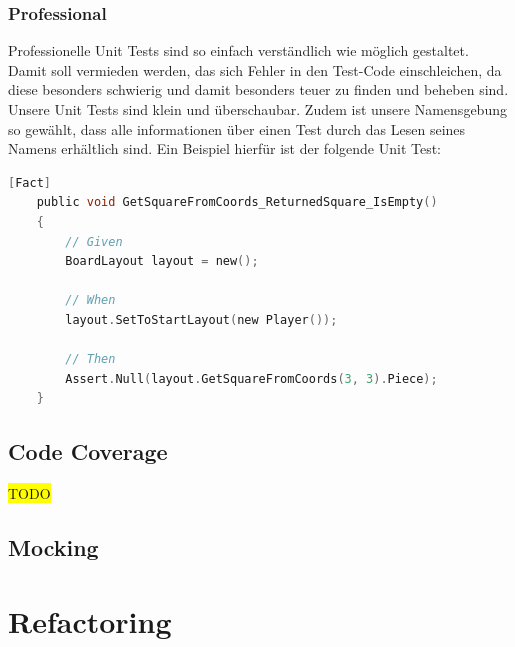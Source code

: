 \documentclass[
10pt, %
a4paper, %
oneside, %
headinclude,footinclude, %
BCOR5mm, %
]{scrartcl}
\begin{document}
\subsubsection{Professional}
Professionelle Unit Tests sind so einfach verständlich wie möglich gestaltet. Damit soll vermieden werden, das sich Fehler in den Test-Code einschleichen, da diese besonders schwierig und damit besonders teuer zu finden und beheben sind.
Unsere Unit Tests sind klein und überschaubar. Zudem ist unsere Namensgebung so gewählt, dass alle informationen über einen Test durch das Lesen seines Namens erhältlich sind. Ein Beispiel hierfür ist der folgende Unit Test:
\begin{lstlisting}[language=c, style=mStyle]
	[Fact]
	public void GetSquareFromCoords_ReturnedSquare_IsEmpty()
	{
		// Given
		BoardLayout layout = new();

		// When
		layout.SetToStartLayout(new Player());
		
		// Then
		Assert.Null(layout.GetSquareFromCoords(3, 3).Piece);
	}
\end{lstlisting}

\subsection{Code Coverage}
\colorbox{yellow}{TODO}
\subsection{Mocking}
\newpage
\section{Refactoring}
\end{document}
